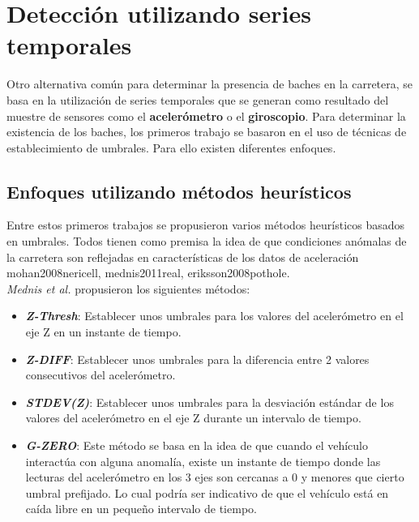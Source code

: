
\section{Detección utilizando series temporales}
	Otro alternativa común para determinar la presencia de baches en la carretera, se basa en la utilización de series temporales que se generan como
	resultado del muestre de sensores como el \textbf{acelerómetro} o el \textbf{giroscopio}. Para determinar la existencia de los baches, los primeros
	trabajo se basaron en el uso de técnicas de establecimiento de umbrales. Para ello existen diferentes enfoques.

	\subsection{Enfoques utilizando métodos heurísticos}
		Entre estos primeros trabajos se propusieron varios métodos heurísticos basados en umbrales. Todos tienen como premisa
		la idea de que condiciones anómalas de la carretera son reflejadas en características de los datos de aceleración\brackcite
		{mohan2008nericell, mednis2011real, eriksson2008pothole}.\\

		\emph{Mednis et al.} propusieron los siguientes métodos:\\

		\begin{itemize}
			\item  \emph{\textbf {Z-Thresh}}: Establecer unos umbrales para los valores del acelerómetro en el eje Z en un instante de tiempo.\\
			\item \emph{\textbf {Z-DIFF}}: Establecer unos umbrales para la diferencia entre 2 valores consecutivos del acelerómetro.\\
			\item \emph{\textbf {STDEV(Z)}}: Establecer unos umbrales para la desviación estándar de los valores del acelerómetro en
				el eje Z durante un intervalo de tiempo.\\ 
			\item \emph{\textbf {G-ZERO}}: Este método se basa en la idea de que cuando el vehículo interactúa con alguna anomalía, existe un
				instante de tiempo donde las lecturas del acelerómetro en los 3 ejes son cercanas a 0 y menores que cierto umbral prefijado. Lo 
				cual podría ser indicativo de que el vehículo está en caída libre en un pequeño intervalo de tiempo.
		\end{itemize}

